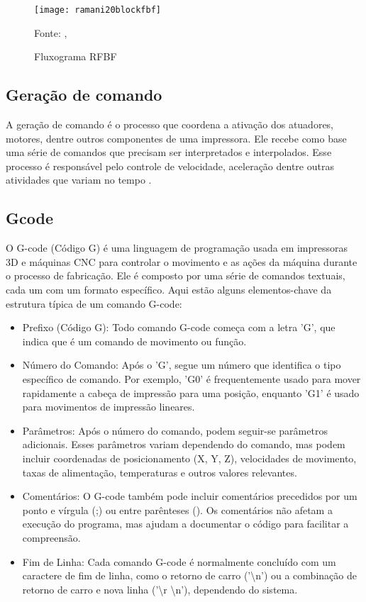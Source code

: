\begin{figure}[!htb]
    \centering
    \caption{Fluxograma RFBF}
    \texttt{[image: ramani20blockfbf]}

    {\footnotesize Fonte: \citeauthor{ramani20}, \citeyear{ramani20}}
    \label{fig:flowchart_rfbf}
\end{figure}

\subsection{Geração de comando}
A geração de comando é o processo que coordena a ativação dos 
atuadores, motores, dentre outros componentes de uma impressora. 
Ele recebe como base uma série de comandos que precisam ser 
interpretados e interpolados. Esse processo é responsável pelo 
controle de velocidade, aceleração dentre outras atividades que 
variam no tempo \cite{yu20}. 

\subsection{Gcode}

O G-code (Código G) é uma linguagem de programação usada em impressoras 3D e máquinas CNC para controlar o movimento e as ações da máquina durante o processo de fabricação. Ele é composto por uma série de comandos textuais, cada um com um formato específico. Aqui estão alguns elementos-chave da estrutura típica de um comando G-code:

\begin{itemize}
    \item Prefixo (Código G): Todo comando G-code começa com a letra 'G', que indica que é um comando de movimento ou função.
    \item Número do Comando: Após o 'G', segue um número que identifica o tipo específico de comando. Por exemplo, 'G0' é frequentemente usado para mover rapidamente a cabeça de impressão para uma posição, enquanto 'G1' é usado para movimentos de impressão lineares.
    \item Parâmetros: Após o número do comando, podem seguir-se parâmetros adicionais. Esses parâmetros variam dependendo do comando, mas podem incluir coordenadas de posicionamento (X, Y, Z), velocidades de movimento, taxas de alimentação, temperaturas e outros valores relevantes.
    \item Comentários: O G-code também pode incluir comentários precedidos por um ponto e vírgula (;) ou entre parênteses (). Os comentários não afetam a execução do programa, mas ajudam a documentar o código para facilitar a compreensão.
    \item Fim de Linha: Cada comando G-code é normalmente concluído com um caractere de fim de linha, como o retorno de carro ('\textbackslash n') ou a combinação de retorno de carro e nova linha ('\textbackslash r \textbackslash n'), dependendo do sistema.
\end{itemize}

